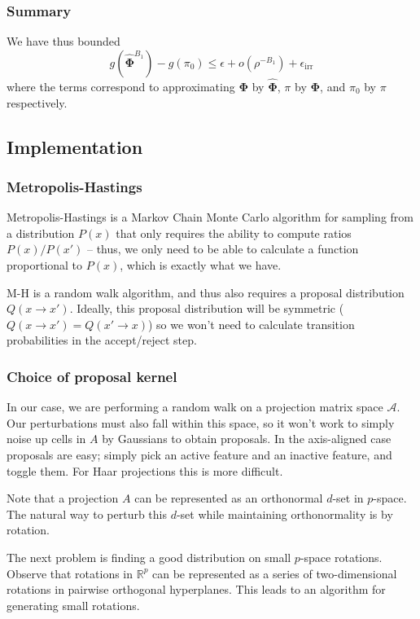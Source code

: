 \documentclass{amsart}
\begin{document}
\subsubsection{Summary}

We have thus bounded 
\[
g(\hat{\bm{\Phi}}^{B_1})-g(\pi_0) \leq \epsilon + o(\rho^{-B_1}) + \epsilon_\mathrm{irr}
\]
where the terms correspond to approximating $\bm{\Phi}$ by $\hat{\bm{\Phi}}$, $\pi$ by $\bm{\Phi}$, and $\pi_0$ by $\pi$ respectively.

\subsection{Implementation}

\subsubsection{Metropolis-Hastings}

Metropolis-Hastings \cite{MRRTT53} is a Markov Chain Monte Carlo algorithm for sampling from a distribution $P(x)$ that only requires the ability to compute ratios $P(x)/P(x')$ -- thus, we only need to be able to calculate a function proportional to $P(x)$, which is exactly what we have.

M-H is a random walk algorithm, and thus also requires a proposal distribution $Q(x\to x')$. Ideally, this proposal distribution will be symmetric ($Q(x\to x')=Q(x'\to x)$) so we won't need to calculate transition probabilities in the accept/reject step.

\subsubsection{Choice of proposal kernel}

In our case, we are performing a random walk on a projection matrix space $\mathcal A$. Our perturbations must also fall within this space, so it won't work to simply noise up cells in $A$ by Gaussians to obtain proposals. In the axis-aligned case proposals are easy; simply pick an active feature and an inactive feature, and toggle them. For Haar projections this is more difficult.

Note that a projection $A$ can be represented as an orthonormal $d$-set in $p$-space. The natural way to perturb this $d$-set while maintaining orthonormality is by rotation.

The next problem is finding a good distribution on small $p$-space rotations. Observe that rotations in $\mathbb R^p$ can be represented as a series of two-dimensional rotations in pairwise orthogonal hyperplanes. This leads to an algorithm for generating small rotations.
\end{document}
